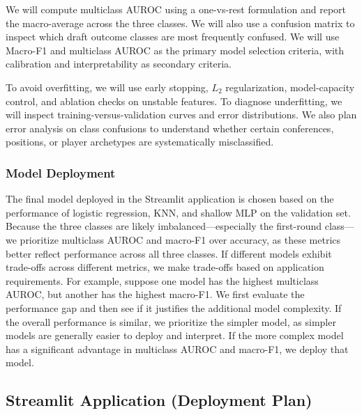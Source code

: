 We will compute multiclass AUROC using a one-vs-rest formulation and report the macro-average across the three classes. We will also use a confusion matrix to inspect which draft outcome classes are most frequently confused. We will use Macro-F1 and multiclass AUROC as the primary model selection criteria, with calibration and interpretability as secondary criteria.

To avoid overfitting, we will use early stopping, $L_2$ regularization, model-capacity control, and ablation checks on unstable features. To diagnose underfitting, we will inspect training-versus-validation curves and error distributions. We also plan error analysis on class confusions to understand whether certain conferences, positions, or player archetypes are systematically misclassified.

\subsubsection{Model Deployment}

The final model deployed in the Streamlit application is chosen based on the performance of logistic regression, KNN, and shallow MLP on the validation set. Because the three classes are likely imbalanced---especially the first-round class---we prioritize multiclass AUROC and macro-F1 over accuracy, as these metrics better reflect performance across all three classes.
If different models exhibit trade-offs across different metrics, we make trade-offs based on application requirements. For example, suppose one model has the highest multiclass AUROC, but another has the highest macro-F1. We first evaluate the performance gap and then see if it justifies the additional model complexity. If the overall performance is similar, we prioritize the simpler model, as simpler models are generally easier to deploy and interpret. If the more complex model has a significant advantage in multiclass AUROC and macro-F1, we deploy that model.


\subsection{Streamlit Application (Deployment Plan)}


